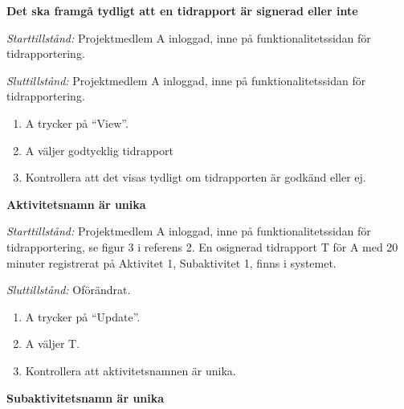 \documentclass[a4paper]{article}
\begin{document}
\begin{FT}
% 
% 
% 
% 
% 


\item
\textbf{Det ska framgå tydligt att en tidrapport är signerad eller inte}

\emph{Starttillstånd:} Projektmedlem A inloggad, inne på funktionalitetssidan för tidrapportering.

\emph{Sluttillstånd:} Projektmedlem A inloggad, inne på funktionalitetssidan för tidrapportering.

\begin{enumerate}
\item A trycker på ``View''.
\item A väljer godtycklig tidrapport
\item Kontrollera att det visas tydligt om tidrapporten är godkänd eller ej.
\end{enumerate}

\item\textbf{Aktivitetsnamn är unika}

\emph{Starttillstånd:} Projektmedlem A inloggad, inne på funktionalitetssidan för tidrapportering, se figur 3 i referens 2. En osignerad tidrapport T för A med 20 minuter registrerat på Aktivitet 1, Subaktivitet 1, finns i systemet.

\emph{Sluttillstånd:} Oförändrat.

\begin{enumerate}
\item A trycker på ``Update''.
\item A väljer T.
\item Kontrollera att aktivitetsnamnen är unika.
\end{enumerate}

\item\textbf{Subaktivitetsnamn är unika}


\end{FT}
\end{document}
